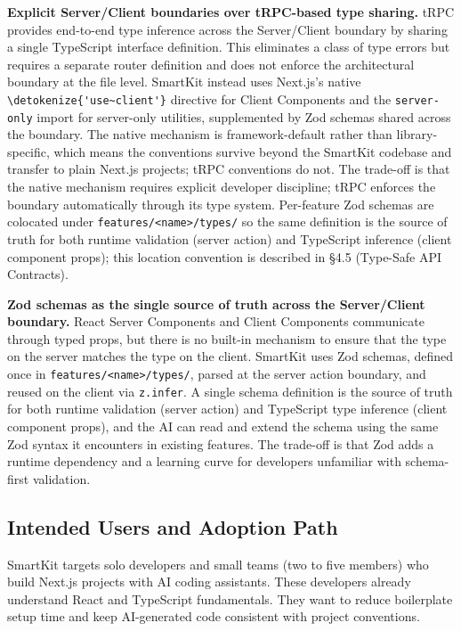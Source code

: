 \documentclass[12pt,a4paper]{report}
\newcommand{\code}[1]{\texttt{\nolinkurl{\detokenize{#1}}}}
\newcommand{\pkg}[1]{\texttt{\nolinkurl{#1}}}
\DeclareRobustCommand{\filename}[1]{\bgroup\urlstyle{tt}\nolinkurl{#1}\egroup}
\newcommand{\usec}{\code{'use~client'}}
\begin{document}
\textbf{Explicit Server/Client boundaries over tRPC-based type sharing.} tRPC provides end-to-end type inference across the Server/Client boundary by sharing a single TypeScript interface definition. This eliminates a class of type errors but requires a separate router definition and does not enforce the architectural boundary at the file level. SmartKit instead uses Next.js's native \usec{} directive for Client Components and the \pkg{server-only} import for server-only utilities, supplemented by Zod schemas shared across the boundary. The native mechanism is framework-default rather than library-specific, which means the conventions survive beyond the SmartKit codebase and transfer to plain Next.js projects; tRPC conventions do not. The trade-off is that the native mechanism requires explicit developer discipline; tRPC enforces the boundary automatically through its type system. Per-feature Zod schemas are colocated under \filename{features/<name>/types/} so the same definition is the source of truth for both runtime validation (server action) and TypeScript inference (client component props); this location convention is described in \S4.5 (Type-Safe API Contracts).

\textbf{Zod schemas as the single source of truth across the Server/Client boundary.} React Server Components and Client Components communicate through typed props, but there is no built-in mechanism to ensure that the type on the server matches the type on the client. SmartKit uses Zod schemas, defined once in \filename{features/<name>/types/}, parsed at the server action boundary, and reused on the client via \pkg{z.infer}. A single schema definition is the source of truth for both runtime validation (server action) and TypeScript type inference (client component props), and the AI can read and extend the schema using the same Zod syntax it encounters in existing features. The trade-off is that Zod adds a runtime dependency and a learning curve for developers unfamiliar with schema-first validation.

\subsection{Intended Users and Adoption Path}

SmartKit targets solo developers and small teams (two to five members) who build Next.js projects with AI coding assistants. These developers already understand React and TypeScript fundamentals. They want to reduce boilerplate setup time and keep AI-generated code consistent with project conventions.
\end{document}
